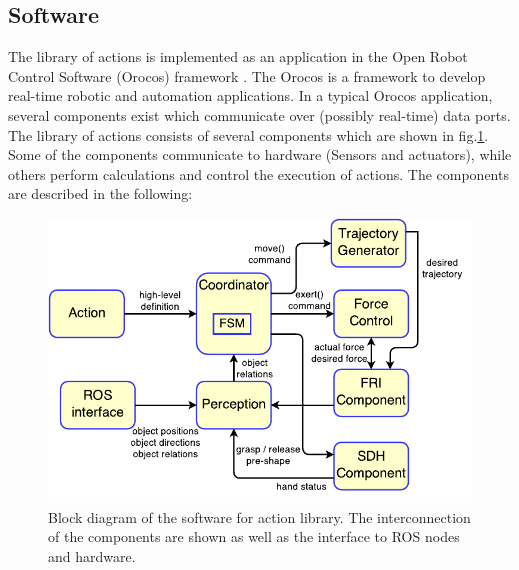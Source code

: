 \subsection{Software}
\label{sec:software}
The library of actions is implemented as an application in the Open Robot Control Software (Orocos) framework \cite{rtt-url,soetens2006}.
The Orocos is a framework to develop real-time robotic and automation applications.
In a typical Orocos application, several components exist which communicate over (possibly real-time) data ports.
The library of actions consists of several components which are shown in fig.\ref{fig:software_structure}.
Some of the components communicate to hardware (Sensors and actuators), while others perform calculations and control the execution of actions.
The components are described in the following:
\begin{figure}
      \centering
      \includegraphics[scale=1]{./pdf/software_structure.pdf}
      \caption{ Block diagram of the software for action library.
      The interconnection of the components are shown as well as the interface to ROS nodes and hardware.
}
      \label{fig:software_structure}
\end{figure}



